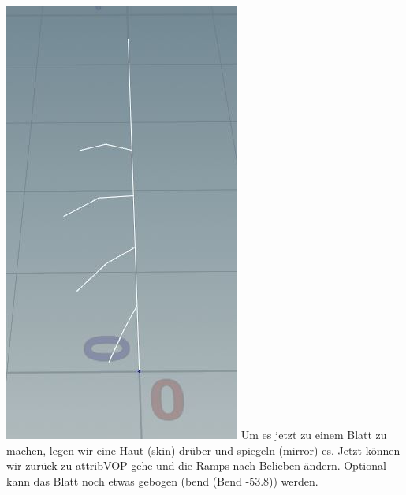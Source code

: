 \begin{​itemize}
\includegraphics*[width=\textwidth]{graphics/blossom1.JPG}
Um es jetzt zu einem Blatt zu machen, legen wir eine Haut (skin) drüber und spiegeln (mirror) es. Jetzt können wir zurück zu attribVOP gehe und die Ramps nach Belieben ändern. Optional kann das Blatt noch etwas gebogen (bend (Bend -53.8)) werden. 

\end{​itemize}
